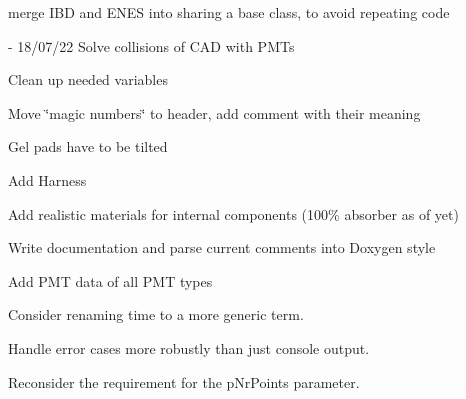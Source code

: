 \begin{DoxyRefList}
merge IBD and ENES into sharing a base class, to avoid repeating code  
\item[File \mbox{\hyperlink{_o_m_sim_l_o_m18_8cc}{OMSim\+LOM18.cc}} ]\label{todo__todo000006}%
%
-\/ 18/07/22 Solve collisions of CAD with PMTs
\begin{DoxyItemize}
\item Clean up needed variables
\item Move \char`\"{}magic numbers\char`\"{} to header, add comment with their meaning
\item Gel pads have to be tilted
\item Add Harness
\item Add realistic materials for internal components (100\% absorber as of yet)
\item Write documentation and parse current comments into Doxygen style  
\end{DoxyItemize}
\item[Member \mbox{\hyperlink{class_o_m_sim_p_m_t_response_a0dd544847ff216a24aa8c528e76c9aed}{OMSim\+PMTResponse\+::create\+Histogram\+From\+Data}} (const std\+::string \&p\+File\+Path, const char $\ast$p\+TH2\+DName)]\label{todo__todo000002}%
%
Add PMT data of all PMT types  
\item[Member \mbox{\hyperlink{class_o_m_sim_s_n_tools_a704058ea142089a962a89b3dae706aa8}{OMSim\+SNTools\+::find\+Time}} (G4double time, std\+::vector$<$ G4double $>$ timearray)]\label{todo__todo000013}%
%
Consider renaming \textquotesingle{}time\textquotesingle{} to a more generic term.  
\item[Member \mbox{\hyperlink{class_o_m_sim_s_n_tools_a89a22f20d0aff91704cf6cab1b48d266}{OMSim\+SNTools\+::get\+File\+Names}} (int value)]\label{todo__todo000011}%
%
Handle error cases more robustly than just console output.  
\item[Member \mbox{\hyperlink{class_o_m_sim_s_n_tools_afe3ad7c2e7664ff456a98e13b394d17d}{OMSim\+SNTools\+::sample\+Value\+From\+Distribution}} (std\+::vector$<$ G4double $>$ xvals, std\+::vector$<$ G4double $>$ yvals, G4int n\+Points)]\label{todo__todo000012}%
%
Reconsider the requirement for the \textquotesingle{}p\+Nr\+Points\textquotesingle{} parameter. 
\end{DoxyRefList}